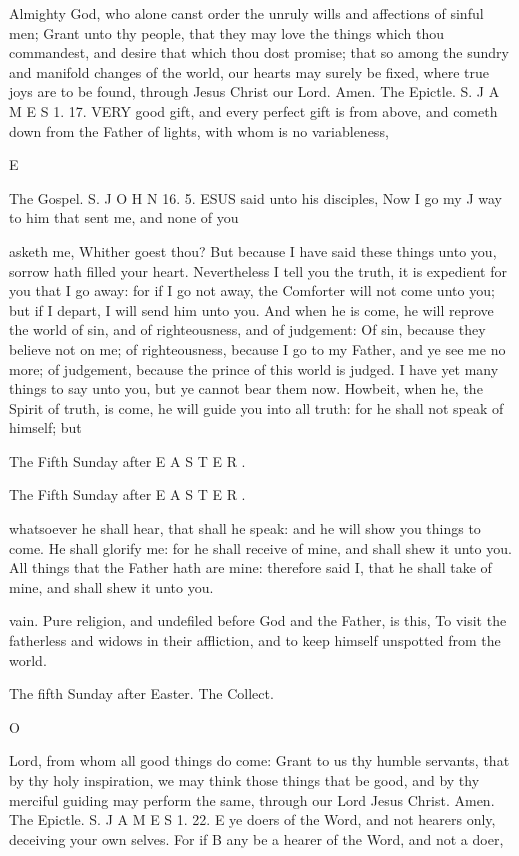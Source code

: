 Almighty God, who alone canst order the unruly wills and affections of sinful men; Grant unto thy people, that they may love the things which thou commandest, and desire that which thou dost promise; that so among the sundry and manifold changes of the world, our hearts may surely be fixed, where true joys are to be found, through Jesus Christ our Lord. Amen. The Epictle. S. J A M E S 1. 17. VERY good gift, and every perfect gift is from above, and cometh down from the Father of lights, with whom is no variableness,

E

The Gospel. S. J O H N 16. 5. ESUS said unto his disciples, Now I go my J way to him that sent me, and none of you

asketh me, Whither goest thou? But because I have said these things unto you, sorrow hath filled your heart. Nevertheless I tell you the truth, it is expedient for you that I go away: for if I go not away, the Comforter will not come unto you; but if I depart, I will send him unto you. And when he is come, he will reprove the world of sin, and of righteousness, and of judgement: Of sin, because they believe not on me; of righteousness, because I go to my Father, and ye see me no more; of judgement, because the prince of this world is judged. I have yet many things to say unto you, but ye cannot bear them now. Howbeit, when he, the Spirit of truth, is come, he will guide you into all truth: for he shall not speak of himself; but

The Fifth Sunday after E A S T E R .

The Fifth Sunday after E A S T E R .

whatsoever he shall hear, that shall he speak: and he will show you things to come. He shall glorify me: for he shall receive of mine, and shall shew it unto you. All things that the Father hath are mine: therefore said I, that he shall take of mine, and shall shew it unto you.

vain. Pure religion, and undefiled before God and the Father, is this, To visit the fatherless and widows in their affliction, and to keep himself unspotted from the world.

The fifth Sunday after Easter. The Collect.

O

Lord, from whom all good things do come: Grant to us thy humble servants, that by thy holy inspiration, we may think those things that be good, and by thy merciful guiding may perform the same, through our Lord Jesus Christ. Amen. The Epictle. S. J A M E S 1. 22. E ye doers of the Word, and not hearers only, deceiving your own selves. For if B any be a hearer of the Word, and not a doer,

